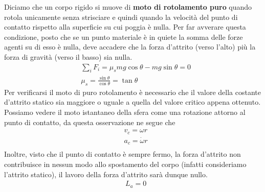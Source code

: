 \documentclass[10pt,a4paper]{article}
\begin{document}
Diciamo che un corpo rigido si muove di \textbf{moto di rotolamento puro} quando rotola unicamente senza strisciare e quindi quando la velocità del punto di contatto rispetto alla superficie su cui poggia è nulla. Per far avverare questa condizione, posto che se un punto materiale è in quiete la somma delle forze agenti su di esso è nulla, deve accadere che la forza d'attrito (verso l'alto) più la forza di gravità (verso il basso) sia nulla. 
\begin{align*}
	&\sum_i {F_i} = \mu_s mg \cos \theta - mg \sin \theta = 0\\
	&\mu_s = \frac{\sin\theta}{\cos\theta}=\tan\theta
\end{align*}
Per verificarsi il moto di puro rotolamento è necessario che il valore della costante d'attrito statico sia maggiore o uguale a quella del valore critico appena ottenuto.\\
Possiamo vedere il moto istantaneo della sfera come una rotazione attorno al punto di contatto, da questa  osservazione ne segue che 
\begin{align*}
	&v_c = \omega r\\
	&a_c = \dot{\omega} r\\
\end{align*}
Inoltre, visto che il punto di contatto è sempre fermo, la forza d'attrito non contribuisce in nessun modo allo spostamento del corpo (infatti consideriamo l'attrito statico), il lavoro della forza d'attrito sarà dunque nullo.
\begin{align*}
	&L_a = 0
\end{align*}
\end{document}
